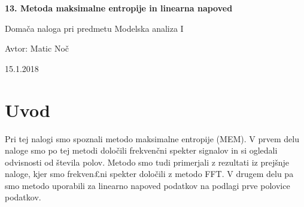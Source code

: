\documentclass[11pt, a4paper]{article}
\begin{document}
    \begin{center}
    {\LARGE\bfseries 13. Metoda maksimalne entropije in linearna napoved \par}
    \vspace{1cm}
    
    {\Large Domača naloga pri predmetu Modelska analiza I\par}
    \vspace{0.2cm}
    {\normalsize Avtor: Matic Noč \par}
    \vspace{0.2cm}    
    {\normalsize 15.1.2018\par}    

    
    \end{center}
\section{Uvod}
Pri tej nalogi smo spoznali metodo maksimalne entropije (MEM). V prvem delu naloge smo po tej metodi določili frekvenčni spekter signalov in si ogledali odvisnosti od števila polov. Metodo smo tudi primerjali z rezultati iz prejšnje naloge, kjer smo frekven£ni spekter določili z metodo FFT. V drugem delu pa smo metodo uporabili za linearno napoved podatkov na podlagi prve polovice podatkov. 
\end{document}
